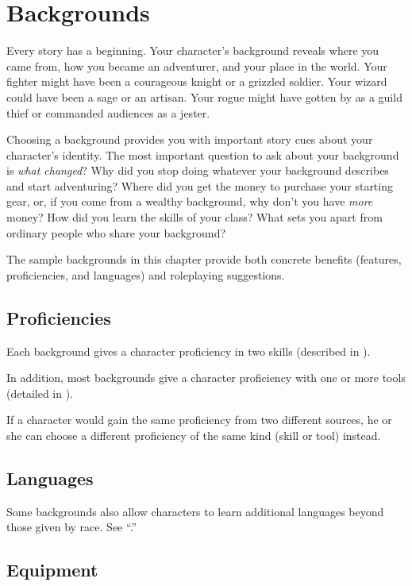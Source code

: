 \section{Backgrounds}
\label{sec:backgrounds}

Every story has a beginning. Your character's background reveals where you came from, how you became an adventurer, and your place in the world. Your fighter might have been a courageous knight or a grizzled soldier. Your wizard could have been a sage or an artisan. Your rogue might have gotten by as a guild thief or commanded audiences as a jester.

Choosing a background provides you with important story cues about your character's identity. The most important question to ask about your background is \textit{what changed}? Why did you stop doing whatever your background describes and start adventuring? Where did you get the money to purchase your starting gear, or, if you come from a wealthy background, why don't you have \textit{more} money? How did you learn the skills of your class? What sets you apart from ordinary people who share your background?

The sample backgrounds in this chapter provide both concrete benefits (features, proficiencies, and languages) and roleplaying suggestions.

\subsection{Proficiencies}

Each background gives a character proficiency in two skills (described in ).

In addition, most backgrounds give a character proficiency with one or more tools (detailed in ).

If a character would gain the same proficiency from two different sources, he or she can choose a different proficiency of the same kind (skill or tool) instead.

\subsection{Languages}

Some backgrounds also allow characters to learn additional languages beyond those given by race. See “.”

\subsection{Equipment}

